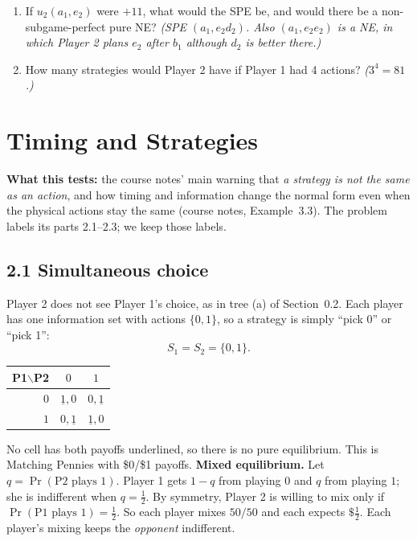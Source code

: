 \documentclass[11pt]{article}
\begin{document}
\begin{selfcheck}
\begin{enumerate}
\item If $u_2(a_1,e_2)$ were $+11$, what would the SPE be, and would there be a non-subgame-perfect pure NE? \emph{(SPE $(a_1,e_2d_2)$. Also $(a_1,e_2e_2)$ is a NE, in which Player 2 plans $e_2$ after $b_1$ although $d_2$ is better there.)}
\item How many strategies would Player 2 have if Player 1 had 4 actions? \emph{($3^4=81$.)}
\end{enumerate}
\end{selfcheck}

\section{Timing and Strategies}

\textbf{What this tests:} the course notes' main warning that \emph{a strategy is not the same as an action}, and how timing and information change the normal form even when the physical actions stay the same (course notes, Example~3.3). The problem labels its parts 2.1--2.3; we keep those labels.

\subsection*{2.1 Simultaneous choice}
Player 2 does not see Player 1's choice, as in tree (a) of Section~0.2. Each player has one information set with actions $\{0,1\}$, so a strategy is simply ``pick 0'' or ``pick 1'':
\[
S_1=S_2=\{0,1\}.
\]
\begin{center}
\begin{tabular}{r|cc}
P1$\backslash$P2 & $0$ & $1$ \\ \hline
$0$ & $\underline{1},0$ & $0,\underline{1}$ \\
$1$ & $0,\underline{1}$ & $\underline{1},0$
\end{tabular}
\end{center}
No cell has both payoffs underlined, so there is no pure equilibrium. This is Matching Pennies with \$0/\$1 payoffs. \textbf{Mixed equilibrium.} Let $q=\Pr(\text{P2 plays }1)$. Player 1 gets $1-q$ from playing $0$ and $q$ from playing $1$; she is indifferent when $q=\tfrac12$. By symmetry, Player 2 is willing to mix only if $\Pr(\text{P1 plays }1)=\tfrac12$. So each player mixes $50/50$ and each expects $\$\tfrac12$. Each player's mixing keeps the \emph{opponent} indifferent.
\end{document}
